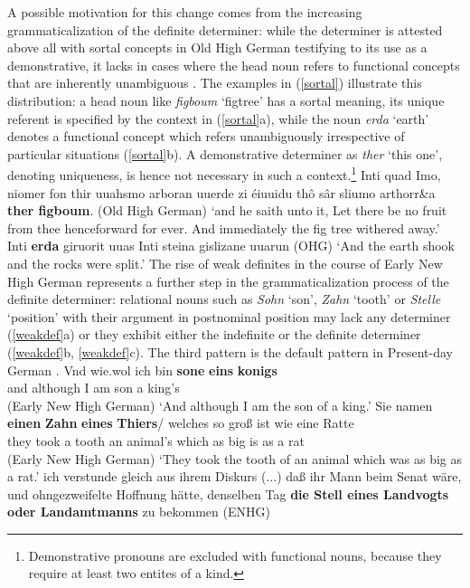 \documentclass[output=paper
                ,modfonts
                ,nonflat
	        ,collection
	        ,collectionchapter
	        ,collectiontoclongg
 	        ,biblatex
                ,babelshorthands
                ,newtxmath
                ,draftmode
                ,colorlinks, citecolor=brown
]{./langsci/langscibook}
\begin{document}
A possible motivation for this change comes from the increasing grammaticalization of the definite determiner: while the determiner is attested above all with sortal concepts in Old High German testifying to its use as a demonstrative, it lacks in cases where the head noun refers to functional concepts that are inherently unambiguous \citep{demske2001}. The examples in (\ref{sortal}) illustrate this distribution: a head noun like \textit{figboum} `figtree' has a sortal meaning, \ie its unique referent is specified by the context in (\ref{sortal}a), while the noun \textit{erda} `earth' denotes a functional concept which refers unambiguously irrespective of particular situations (\ref{sortal}b). A demonstrative determiner as \textit{ther} `this one', denoting uniqueness, is hence not necessary in such a context.\footnote{Demonstrative pronouns are excluded with functional nouns, because they require at least two entites of a kind.}
\eal \label{sortal}
\ex Inti quad Imo, niomer fon thir uuahsmo arboran uuerde zi éiuuidu thô sâr sliumo arthorr\&{a} \textbf{ther figboum}. \hfill (Old High German)
\glt `and he saith unto it, Let there be no fruit from thee henceforward for ever. And immediately the fig tree withered away.'
\ex Inti \textbf{erda} giruorit uuas Inti steina gislizane uuarun \hfill (OHG)
\glt `And the earth shook and the rocks were split.'  
\zl
The rise of weak definites in the course of Early New High German represents a further step in the grammaticalization process of the definite determiner: relational nouns such as \textit{Sohn} `son', \textit{Zahn} `tooth' or \textit{Stelle} `position' with their argument in postnominal position may lack any determiner (\ref{weakdef}a) or they exhibit either the indefinite or the definite determiner (\ref{weakdef}b, \ref{weakdef}c). The third pattern is the default pattern in Present-day German \citep{demske2020}.
\eal \label{weakdef}
\ex 
\gll Vnd wie.wol ich bin \textbf{sone} \textbf{eins} \textbf{konigs} \\  and although I am son a king's \\  \hfill (Early New High German)
\glt `And although I am the son of a king.'
\ex 
\gll Sie namen \textbf{einen} \textbf{Zahn} \textbf{eines} \textbf{Thiers}/ welches so groß ist wie eine Ratte \\ they took a tooth an animal's  which as big is as a rat  \\  \hfill (Early New High German)
\glt `They took the tooth of an animal which was as big as a rat.'
\ex ich verstunde gleich aus ihrem Diskurs (...) daß ihr Mann beim Senat wäre, und ohngezweifelte Hoffnung hätte, denselben Tag \textbf{die Stell eines Landvogts oder Landamtmanns} zu bekommen \hfill (ENHG)
\end{document}
